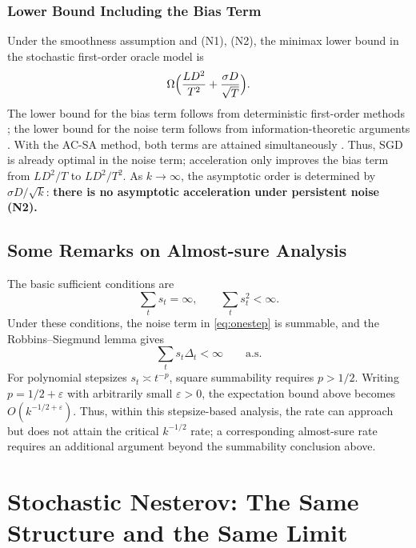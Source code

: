 \documentclass[11pt]{article}
\begin{document}
\subsubsection{Lower Bound Including the Bias Term}

Under the smoothness assumption and (N1), (N2), the minimax lower bound in the stochastic first-order oracle model is
\[
\Omega\Bigl(\frac{LD^2}{T^2}+\frac{\sigma D}{\sqrt T}\Bigr).
\]
The lower bound for the bias term follows from deterministic first-order methods \citep[Theorem~2.1.7]{nesterov2004};
the lower bound for the noise term follows from information-theoretic arguments \citep{nemirovski1983,agarwal2012}.
With the AC-SA method, both terms are attained simultaneously \citep{lan2012}.
Thus, SGD is already optimal in the noise term; acceleration only improves the bias term from $LD^2/T$ to $LD^2/T^2$.
As $k\to\infty$, the asymptotic order is determined by $\sigma D/\sqrt k$: \textbf{there is no asymptotic acceleration under persistent noise (N2).}

\subsection{Some Remarks on Almost-sure Analysis}

The basic sufficient conditions are
\[
\sum_t s_t=\infty,
\qquad
\sum_t s_t^2<\infty.
\]
Under these conditions, the noise term in \eqref{eq:onestep} is summable, and the Robbins--Siegmund lemma \citep{robbins1971} gives
\[
\sum_t s_t\Delta_t<\infty \qquad \text{a.s.}
\]
For polynomial stepsizes $s_t\asymp t^{-p}$, square summability requires $p>1/2$. Writing $p=1/2+\varepsilon$ with arbitrarily small $\varepsilon>0$, the expectation bound above becomes $O(k^{-1/2+\varepsilon})$. Thus, within this stepsize-based analysis, the rate can approach but does not attain the critical $k^{-1/2}$ rate; a corresponding almost-sure rate requires an additional argument beyond the summability conclusion above.

\section{Stochastic Nesterov: The Same Structure and the Same Limit}
\end{document}
